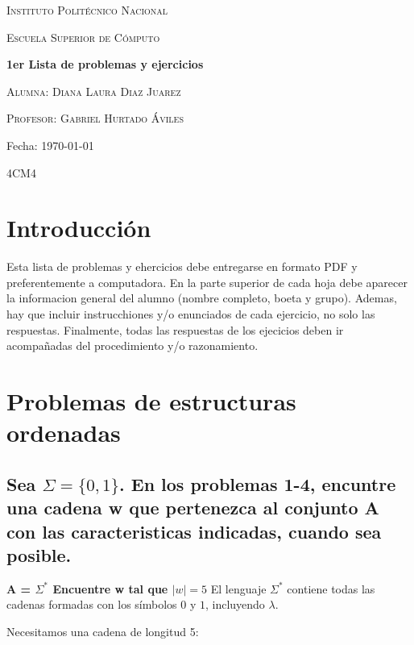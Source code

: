 \documentclass[12pt]{article}
\begin{document}
\begin{titlepage}
    \centering
    {\LARGE \scshape Instituto Politécnico Nacional} \par \vspace{1cm}
    {\Large \scshape Escuela Superior de Cómputo} \par \vspace{1.5cm}
    {\huge \bfseries 1er Lista de problemas y ejercicios} \par \vspace{2cm}
    {\Large \scshape Alumna: Diana Laura Diaz Juarez} \par \vspace{0.5cm}
    {\large \scshape Profesor: Gabriel Hurtado Áviles} \par \vspace{2cm}
    {\large Fecha: \today} \par
\begin{center}
    {\large{4CM4}\\}
\end{center}
\end{titlepage}

\section{Introducción}
Esta lista de problemas y ehercicios debe entregarse en formato PDF y preferentemente a computadora.
En la parte superior de cada hoja debe aparecer la informacion general del alumno (nombre completo, boeta y grupo).
Ademas, hay que incluir instrucchiones y/o enunciados de cada ejercicio, no solo las respuestas.
Finalmente, todas las respuestas de los ejecicios deben ir acompañadas del procedimiento y/o razonamiento.

\section{Problemas de estructuras ordenadas}
\subsection{Sea $\Sigma = \{0,1\}$. En los problemas 1-4, encuntre una cadena w que pertenezca al conjunto A con las caracteristicas indicadas, cuando sea posible.}


\textbf{A = $\Sigma^*$ Encuentre w tal que $|w| = 5$ }
El lenguaje $\Sigma^*$ contiene todas las cadenas formadas con los
símbolos $0$ y $1$, incluyendo $\lambda$.

Necesitamos una cadena de longitud 5:
\end{document}
